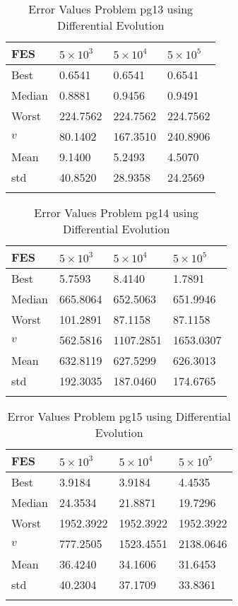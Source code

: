 \documentclass[10pt, a4paper]{book}
\begin{document}
\begin{center}
\begin{longtable}{l l l l}
FES & $5 \times 10^{3}$ & $5 \times 10^{4}$ & $5 \times 10^{5}$ \\
\hline
Best & 0.6541 & 0.6541 & 0.6541 \\
Median & 0.8881 & 0.9456 & 0.9491 \\
Worst & 224.7562 & 224.7562 & 224.7562 \\
$v$ & 80.1402 & 167.3510 & 240.8906 \\
Mean & 9.1400 & 5.2493 & 4.5070 \\
std & 40.8520 & 28.9358 & 24.2569 \\
\caption{ Error Values Problem pg13 using Differential Evolution }
\end{longtable}
\end{center}

\begin{center}
\begin{longtable}{l l l l}
FES & $5 \times 10^{3}$ & $5 \times 10^{4}$ & $5 \times 10^{5}$ \\
\hline
Best & 5.7593 & 8.4140 & 1.7891 \\
Median & 665.8064 & 652.5063 & 651.9946 \\
Worst & 101.2891 & 87.1158 & 87.1158 \\
$v$ & 562.5816 & 1107.2851 & 1653.0307 \\
Mean & 632.8119 & 627.5299 & 626.3013 \\
std & 192.3035 & 187.0460 & 174.6765 \\
\caption{ Error Values Problem pg14 using Differential Evolution }
\end{longtable}
\end{center}

\begin{center}
\begin{longtable}{l l l l}
FES & $5 \times 10^{3}$ & $5 \times 10^{4}$ & $5 \times 10^{5}$ \\
\hline
Best & 3.9184 & 3.9184 & 4.4535 \\
Median & 24.3534 & 21.8871 & 19.7296 \\
Worst & 1952.3922 & 1952.3922 & 1952.3922 \\
$v$ & 777.2505 & 1523.4551 & 2138.0646 \\
Mean & 36.4240 & 34.1606 & 31.6453 \\
std & 40.2304 & 37.1709 & 33.8361 \\
\caption{ Error Values Problem pg15 using Differential Evolution }
\end{longtable}
\end{center}
\end{document}

